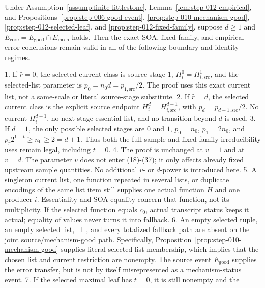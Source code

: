 \begin{proposition}\label{prop:step-012-boundaries}
Under Assumption~\ref{assump:finite-littlestone},
Lemma~\ref{lem:step-012-empirical}, and
Propositions~\ref{prop:step-006-good-event},
\ref{prop:step-010-mechanism-good},
\ref{prop:step-012-selected-leaf}, and
\ref{prop:step-012-fixed-family}, suppose \(d\ge1\) and
\(E_{\mathrm{core}}=E_{\mathrm{good}}\cap E_{\mathrm{mech}}\) holds. Then
the exact SOA, fixed-family, and
empirical-error conclusions remain valid in all of the following boundary
and identity regimes.

1. If \(\widehat r=0\), the selected current class is source stage \(1\),
   \(H_i^0=H_{i,\mathrm{src}}^1\), and the selected-list parameter is
   \(p_0=n_0d=p_{1,\mathrm{src}}/2\). The proof uses this exact current
   list, not a same-scale or literal source-stage substitute.
2. If \(\widehat r=d\), the selected current class is the explicit source
   endpoint \(H_i^d=H_{i,\mathrm{src}}^{d+1}\), with
   \(p_d=p_{d+1,\mathrm{src}}/2\). No current \(H_i^{d+1}\), no next-stage
   essential list, and no transition beyond \(d\) is used.
3. If \(d=1\), the only possible selected stages are \(0\) and \(1\),
   \(p_0=n_0\), \(p_1=2n_0\), and
   \(p_{\widehat r}2^{1-t}\ge n_0\ge2=d+1\). Thus both the full-sample and
   fixed-family irreducibility uses remain legal, including \(t=0\).
4. The proof is unchanged at \(v=1\) and at \(v=d\). The parameter \(v\)
   does not enter (18)-(37); it only affects already fixed upstream sample
   quantities. No additional \(v\)- or \(d\)-power is introduced here.
5. A singleton current list, one function repeated in several lists, or
   duplicate encodings of the same list item still supplies one actual
   function \(\bar H\) and one producer \(i\). Essentiality and SOA
   equality concern that function, not its multiplicity. If the selected
   function equals \(\bar c_0\),  actual transcript status keeps it
   actual; equality of values never turns it into fallback.
6. An empty selected tuple, an empty selected list, \(\perp\), and every
   totalized fallback path are absent on the joint source/mechanism-good
   path. Specifically, Proposition~\ref{prop:step-010-mechanism-good}
   supplies literal selected-list membership, which implies that the chosen
   list and current restriction are nonempty.
   The source event \(E_{\mathrm{good}}\) supplies the error transfer, but
   is not by itself misrepresented as a mechanism-status event.
7. If the selected maximal leaf has \(t=0\), it is still nonempty and the

\end{proposition}

